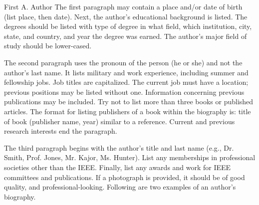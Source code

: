 \documentclass[journal]{IEEEtai}
\begin{document}
\begin{IEEEbiography}{First A. Author}{\space}   The first paragraph may contain a place and/or date of birth (list place, then date). Next, the author’s educational background is listed. The degrees should be listed with type of degree in what field, which institution, city, state, and country, and year the degree was earned. The author's major field of study should be lower-cased.

The second paragraph uses the pronoun of the person (he or she) and not the author's last name. It lists military and work experience, including summer and fellowship jobs. Job titles are capitalized. The current job must have a location; previous positions may be listed without one. Information concerning previous publications may be included. Try not to list more than three books or published articles. The format for listing publishers of a book within the biography is: title of book (publisher name, year) similar to a reference. Current and previous research interests end the paragraph.

The third paragraph begins with the author's title and last name (e.g., Dr. Smith, Prof. Jones, Mr. Kajor, Ms. Hunter). List any memberships in professional societies other than the IEEE. Finally, list any awards and work for IEEE committees and publications. If a photograph is provided, it should be of good quality, and professional-looking. Following are two examples of an author’s biography.
\end{IEEEbiography}
\end{document}
